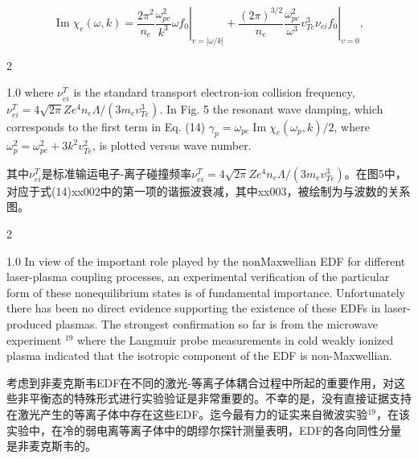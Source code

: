 \documentclass[oneside,onecolumn]{article}
\newcommand\enzhbox[2]{
	\quad\par \begin{paracol}{2} 
			\begin{spacing}{1.0}
					\footnotesize  #1
			\end{spacing}
			
		\switchcolumn[1] 
		#2
	\end{paracol} 
}
\begin{document}
\begin{sloppypar}
  
  \begin{dmath}
  \operatorname{Im} \chi_{e}(\omega, k)=  \left.\frac{2 \pi^{2}}{n_{e}} \frac{\omega_{p e}^{2}}{k^{3}} \omega f_{0}\right|_{v=|\omega / k|}
  +\left.\frac{(2 \pi)^{3 / 2}}{n_{e}} \frac{\omega_{p e}^{2}}{\omega^{3}} v_{T e}^{3} \nu_{e i} f_{0}\right|_{v=0},
  \end{dmath}

  

\enzhbox{  where $\nu_{e i}^{T}$ is the standard transport electron-ion collision frequency, $\nu_{e i}^{T}=4 \sqrt{2 \pi} Z e^{4} n_{e} \Lambda /\left(3 m_{e} v_{T e}^{3}\right)$. In Fig. 5 the resonant wave damping, which corresponds to the first term in Eq. (14) $\gamma_{p}=\omega_{p e} \operatorname{Im} \chi_{e}\left(\omega_{p}, k\right) / 2$, where $\omega_{p}^{2}=\omega_{p e}^{2}+3 k^{2} v_{T e}^{2}$, is plotted versus wave number.
}{
其中$\nu_{e i}^{T}$是标准输运电子-离子碰撞频率$\nu_{e i}^{T}=4 \sqrt{2 \pi} Z e^{4} n_{e} \Lambda /\left(3 m_{e} v_{T e}^{3}\right)$。在图5中，对应于式(14)xx002中的第一项的谐振波衰减，其中xx003，被绘制为与波数的关系图。
}
  

\enzhbox{  In view of the important role played by the nonMaxwellian EDF for different laser-plasma coupling processes, an experimental verification of the particular form of these nonequilibrium states is of fundamental importance. Unfortunately there has been no direct evidence supporting the existence of these EDFs in laser-produced plasmas. The strongest confirmation so far is from the microwave experiment $^{19}$ where the Langmuir probe measurements in cold weakly ionized plasma indicated that the isotropic component of the EDF is non-Maxwellian.
}{
考虑到非麦克斯韦EDF在不同的激光-等离子体耦合过程中所起的重要作用，对这些非平衡态的特殊形式进行实验验证是非常重要的。不幸的是，没有直接证据支持在激光产生的等离子体中存在这些EDF。迄今最有力的证实来自微波实验$^{19}$，在该实验中，在冷的弱电离等离子体中的朗缪尔探针测量表明，EDF的各向同性分量是非麦克斯韦的。
}
  


\end{sloppypar}
\end{document}
